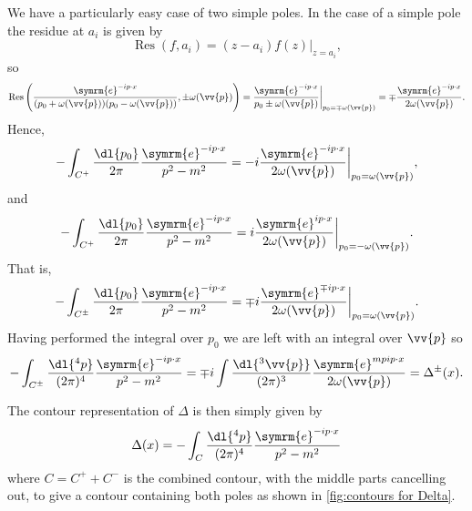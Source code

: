 \documentclass[fleqn]{NotesClass}
\newcommand{\e}{\symrm{e}}
\DeclareMathOperator{\Res}{Res}
\begin{document}
    We have a particularly easy case of two simple poles.
    In the case of a simple pole the residue at \(a_i\) is given by
    \begin{equation}
        \Res(f, a_i) = (z - a_i)f(z)|_{z = a_i},
    \end{equation}
    so
    \begin{equation}
        \Res\left( \frac{\e^{-ip\cdot x}}{(p_0 + \omega(\vv{p}))(p_0 - \omega(\vv{p}))}, \pm \omega(\vv{p}) \right) = \frac{\e^{-ip\cdot x}}{p_0 \pm \omega(\vv{p})} \bigg|_{p_0 = \mp \omega(\vv{p})} = \mp \frac{\e^{-ip\cdot x}}{2\omega(\vv{p})}.
    \end{equation}
    Hence,
    \begin{equation}
        -\int_{C^+} \frac{\dl{p_0}}{2\pi} \frac{\e^{-ip\cdot x}}{p^2 - m^2} = -i \frac{\e^{-ip\cdot x}}{2\omega(\vv{p})}\bigg|_{p_0 = \omega(\vv{p})},
    \end{equation}
    and
    \begin{equation}
        -\int_{C^+} \frac{\dl{p_0}}{2\pi} \frac{\e^{-ip\cdot x}}{p^2 - m^2} = i \frac{\e^{ip\cdot x}}{2\omega(\vv{p})}\bigg|_{p_0 = -\omega(\vv{p})}.
    \end{equation}
    That is,
    \begin{equation}
        -\int_{C^{\pm}} \frac{\dl{p_0}}{2\pi} \frac{\e^{-ip\cdot x}}{p^2 - m^2} = \mp i \frac{\e^{\mp ip\cdot x}}{2\omega(\vv{p})}\bigg|_{p_0 = \omega(\vv{p})}.
    \end{equation}
    Having performed the integral over \(p_0\) we are left with an integral over \(\vv{p}\) so
    \begin{equation}
        -\int_{C^{\pm}} \frac{\dl{^4p}}{(2\pi)^4} \frac{\e^{-ip\cdot x}}{p^2 - m^2} = \mp i \int \frac{\dl{^3\vv{p}}}{(2\pi)^3} \frac{\e^{mp ip \cdot x}}{2\omega(\vv{p})} = \Delta^{\pm}(x).
    \end{equation}
    
    The contour representation of \(\Delta\) is then simply given by
    \begin{equation}
        \Delta(x) = - \int_{C} \frac{\dl{^4p}}{(2\pi)^4} \frac{\e^{-ip\cdot x}}{p^2 - m^2}
    \end{equation}
    where \(C = C^+ + C^-\) is the combined contour, with the middle parts cancelling out, to give a contour containing both poles as shown in \cref{fig:contours for Delta}.
    
\end{document}
